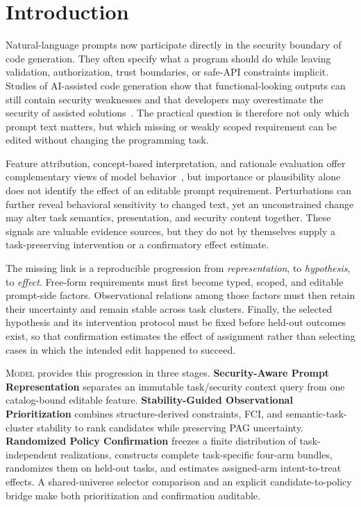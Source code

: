 \documentclass[acmsmall,screen,review,anonymous]{acmart}
\newcommand{\model}{\textsc{Model}\xspace}
\begin{document}
\section{Introduction}

Natural-language prompts now participate directly in the security boundary of
code generation. They often specify what a program should do while leaving
validation, authorization, trust boundaries, or safe-API constraints implicit.
Studies of AI-assisted code generation show that functional-looking outputs
can still contain security weaknesses and that developers may overestimate the
security of assisted solutions~\cite{pearce2022copilot,perry2023assistants}.
The practical question is therefore not only which prompt text matters, but
which missing or weakly scoped requirement can be edited without changing the
programming task.

Feature attribution, concept-based interpretation, and rationale evaluation
offer complementary views of model
behavior~\cite{sundararajan2017integrated,kim2018tcav,lundberg2017shap,deyoung2020eraser},
but importance or plausibility alone does not identify the effect of an
editable prompt requirement. Perturbations can further reveal behavioral
sensitivity to changed text, yet an unconstrained change may alter task
semantics, presentation, and security content together. These signals are
valuable evidence sources, but they do not by themselves supply a
task-preserving intervention or a confirmatory effect estimate.

The missing link is a reproducible progression from \emph{representation}, to
\emph{hypothesis}, to \emph{effect}. Free-form requirements must first become
typed, scoped, and editable prompt-side factors. Observational relations among
those factors must then retain their uncertainty and remain stable across task
clusters. Finally, the selected hypothesis and its intervention protocol must
be fixed before held-out outcomes exist, so that confirmation estimates the
effect of assignment rather than selecting cases in which the intended edit
happened to succeed.

\model provides this progression in three stages.
\textbf{Security-Aware Prompt Representation} separates an immutable
task/security context query from one catalog-bound editable feature.
\textbf{Stability-Guided Observational Prioritization} combines structure-derived
constraints, FCI, and semantic-task-cluster stability to rank candidates while
preserving PAG uncertainty.
\textbf{Randomized Policy Confirmation} freezes a finite distribution of
task-independent realizations, constructs complete task-specific four-arm
bundles, randomizes them on held-out tasks, and estimates assigned-arm
intent-to-treat effects. A shared-universe selector comparison and an explicit
candidate-to-policy bridge make both prioritization and confirmation auditable.
\end{document}
